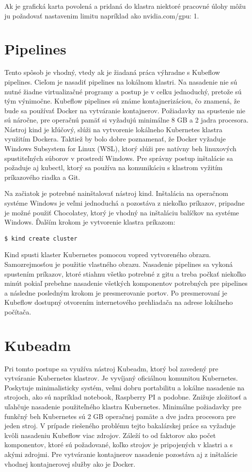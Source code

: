 Ak je grafická karta povolená a pridaná do klastra niektoré pracovné úlohy môžu ju požadovať nastavenim limitu napríklad ako nvidia.com/gpu: 1.

\section{Pipelines}

Tento spôsob je vhodný, vtedy ak je žiadaná práca výhradne s Kubeflow pipelines. Cieľom je nasadiť pipelines na lokálnom klastri. Na nasadenie nie sú nutné žiadne virtualizačné programy a postup je v celku jednoduchý, pretože sú tým výnimočne. Kubeflow pipelines sú známe kontajnerizáciou, čo znamená, že bude sa používať Docker na vytváranie kontajnerov. Požiadavky na spustenie nie sú náročne, pre operačnú pamäť si vyžadujú minimálne 8 GB a 2 jadra procesora. Nástroj kind je kľúčový, slúži na vytvorenie lokálneho Kubernetes klastra využitím Dockera. Taktiež by bolo dobre poznamenať, že Docker vyžaduje Windows Subsystem for Linux (WSL), ktorý slúži pre natívny beh linuxových spustiteľných súborov v prostredí Windows. Pre správny postup inštalácie sa požaduje aj kubectl, ktorý sa používa na komunikáciu s klastrom vyžitím príkazového riadka a Git.

Na začiatok je potrebné nainštalovať nástroj kind. Inštalácia na operačnom systéme Windows je veľmi jednoduchá a pozostáva z niekoľko príkazov, pripadne je možné použiť Chocolatey, ktorý je vhodný na inštaláciu balíčkov na systéme Windows. Ďalším krokom je vytvorenie klastra príkazom:

\begin{lstlisting}[language=Bash]
    $ kind create cluster
    \end{lstlisting}

Kind spusti klaster Kubernetes pomocou vopred vytvoreného obrazu. Samozrejmosťou je použitie vlastného obrazu. Nasadenie pipelines sa vykoná spustením príkazov, ktoré stiahnu všetko potrebné z gitu a treba počkať niekoľko minút pokiaľ prebehne nasadenie všetkých komponentov potrebných pre pipelines a následne posledným krokom je presmerovanie portov. Po presmerovaní je Kubeflow dostupný otvorením internetového prehliadača na adrese lokálneho počítača.

\section{Kubeadm}

Pri tomto postupe sa využíva nástroj Kubeadm, ktorý bol zavedený pre vytváranie Kubernetes klastrov. Je vyvíjaný oficiálnou komunitou Kubernetes. Poskytuje minimalisticky systém, veľmi dobru portabilitu a lokálne nasadenie na strojoch, ako sú napríklad notebook, Raspberry PI a podobne. Znižuje zložitosť a uľahčuje nasadenie použiteľného klastra Kubernetes. Minimálne požiadavky pre funkčný beh Kubernetes sú 2 GB operačnej pamäte a dve jadra procesora pre jeden stroj. V prípade riešeného problému tejto bakalárskej práce sa vyžaduje kvôli nasadeniu Kubeflow viac zdrojov. Záleží to od faktorov ako počet komponentov, ktoré sú požadované, koľko strojov je pripojených v klastri a s akými zdrojmi. Pre vytváranie kontajnerov nasadenie pozostáva aj z inštalácie vhodnej kontajnerovej služby ako je Docker.

